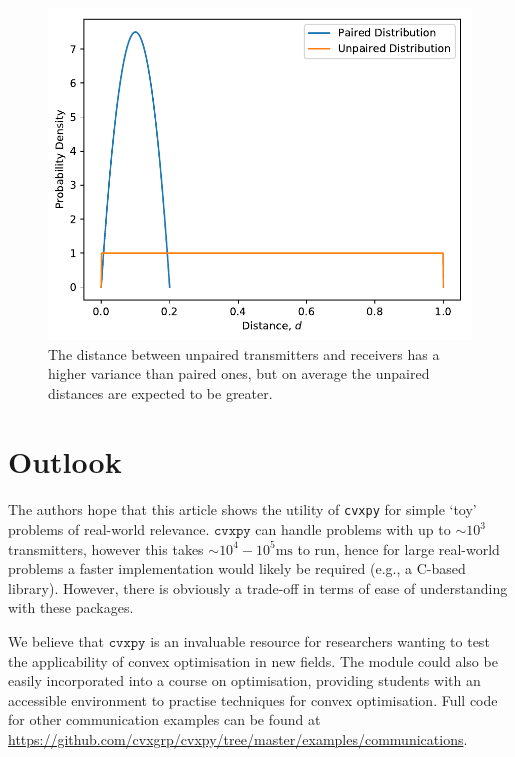 \documentclass[twocolumn,secnumarabic,amssymb, nobibnotes, aps, prl,superscriptaddress]{revtex4-1}
\def\cpp{{C\hspace{-.05em}\raisebox{.4ex}{\tiny\bf ++}}}
\begin{document}
\begin{figure}[h!]
\includegraphics[width=0.9\linewidth]{distance_distributions.pdf}
\caption{\label{fig:dist}The distance between unpaired transmitters and receivers has a higher variance than paired ones, but on average the unpaired distances are expected to be greater.} 
\end{figure}



\section{Outlook}
\noindent The authors hope that this article shows the utility of \texttt{cvxpy} for simple `toy' problems of real-world relevance. $\texttt{cvxpy}$ can handle problems with up to $\sim 10^3$ transmitters, however this takes $\sim 10^{4}-10^{5}\text{ms}$ to run, hence for large real-world problems a faster implementation would likely be required (e.g., a \cpp-based library). However, there is obviously a trade-off in terms of ease of understanding with these packages.

We believe that $\texttt{cvxpy}$ is an invaluable resource for researchers wanting to test the applicability of convex optimisation in new fields. The module could also be easily incorporated into a course on optimisation, providing students with an accessible environment to practise techniques for convex optimisation. Full code for other communication examples can be found at \url{https://github.com/cvxgrp/cvxpy/tree/master/examples/communications}.
\end{document}
